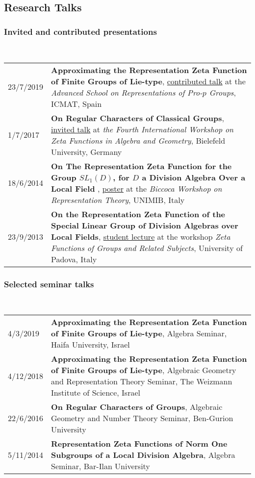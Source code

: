 \documentclass[leqno,11pt,a4paper]{amsart}
\numberwithin{equation}{section}
\numberwithin{figure}{section}
\theoremstyle{plain}
\theoremstyle{definition}
\theoremstyle{remark}
\begin{document}
%
%
%
%
%

\subsection*{\sc Research Talks}
\subsubsection*{Invited and contributed presentations}~
\begin{longtable}{p{}p{}}
23/7/2019&  \textbf{Approximating the Representation Zeta Function of Finite Groups of Lie-type}, \underline{contributed talk} at the \textit{Advanced School on Representations of Pro-$p$ Groups}, ICMAT, Spain
\\
1/7/2017& \textbf{On Regular Characters of Classical Groups}, \underline{invited talk} at \textit{the Fourth International Workshop on Zeta Functions in Algebra and Geometry},  Bielefeld University, Germany
\\
18/6/2014 &\textbf{On The Representation Zeta Function for the Group $SL_1(D)$, for $D$ a Division Algebra Over a Local Field}
, \underline{poster} at the {\it Biccoca Workshop on Representation Theory}, UNIMIB, Italy
\\
23/9/2013&\textbf{On the Representation Zeta Function of the Special Linear Group of Division Algebras over Local Fields}, \underline{student lecture} at the workshop \textit{Zeta Functions of Groups and Related Subjects}, University of Padova, Italy\\
\end{longtable}
\subsubsection*{Selected seminar talks}~
\begin{longtable}{p{}p{}}
4/3/2019&\textbf{Approximating the Representation Zeta Function of Finite Groups of Lie-type}, Algebra Seminar, Haifa University, Israel\\
4/12/2018&\textbf{Approximating the Representation Zeta Function of Finite Groups of Lie-type}, Algebraic Geometry and Representation Theory Seminar, The Weizmann Institute of Science, Israel\\
22/6/2016&\textbf{On Regular Characters of Groups}, Algebraic Geometry and Number Theory Seminar, Ben-Gurion University\\
5/11/2014&\textbf{Representation Zeta Functions of Norm One Subgroups of a Local Division Algebra}, Algebra Seminar, Bar-Ilan University\end{longtable}
~\\
\end{document}

